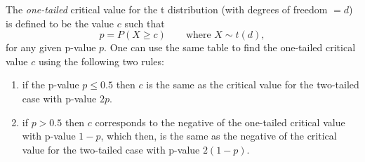 \documentclass[12pt]{article}
\begin{document}
The \emph{one-tailed} critical value for the t distribution
(with degrees of freedom $=d$) is defined to be the value $c$ such that 
$$p=P(X\ge c)\qquad\mbox{where }X\sim t(d),$$ 
for any given p-value $p$.  One can use the same table to find the one-tailed critical value $c$ using the following two rules:
\begin{enumerate}
\item if the p-value $p\le0.5$ then $c$ is the same as the critical
value for the two-tailed case with p-value $2p$.
\item if $p>0.5$ then $c$ corresponds to the negative of the
one-tailed critical value with p-value $1-p$, which then, is the
same as the negative of the critical value for the two-tailed case
with p-value $2(1-p)$.
\end{enumerate}
\end{document}
